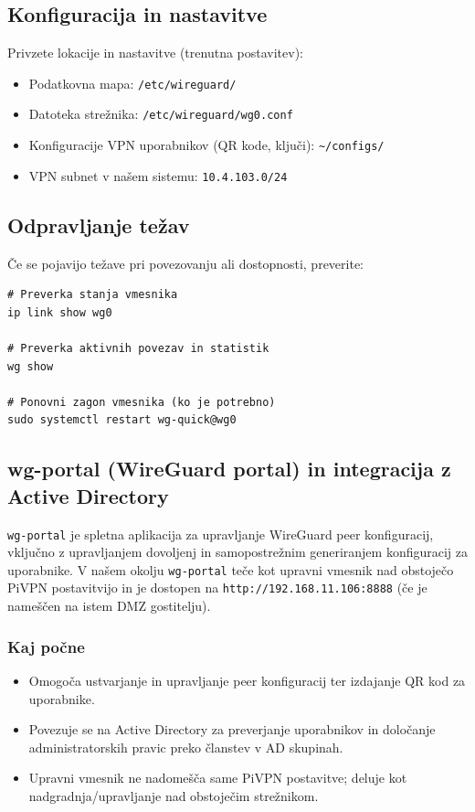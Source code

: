 \documentclass[a4paper,11pt]{article}
\begin{document}
\subsection{Konfiguracija in nastavitve}
Privzete lokacije in nastavitve (trenutna postavitev):
\begin{itemize}
  \item Podatkovna mapa: \verb|/etc/wireguard/|
  \item Datoteka strežnika: \verb|/etc/wireguard/wg0.conf|
  \item Konfiguracije VPN uporabnikov (QR kode, ključi): \verb|~/configs/|
  \item VPN subnet v našem sistemu: \texttt{10.4.103.0/24}
\end{itemize}

\subsection{Odpravljanje težav}
Če se pojavijo težave pri povezovanju ali dostopnosti, preverite:
\begin{lstlisting}
# Preverka stanja vmesnika
ip link show wg0

# Preverka aktivnih povezav in statistik
wg show

# Ponovni zagon vmesnika (ko je potrebno)
sudo systemctl restart wg-quick@wg0
\end{lstlisting}

\subsection{wg-portal (WireGuard portal) in integracija z Active Directory}
\texttt{wg-portal} je spletna aplikacija za upravljanje WireGuard peer konfiguracij, vključno z upravljanjem dovoljenj in samopostrežnim generiranjem konfiguracij za uporabnike. 
V našem okolju \texttt{wg-portal} teče kot upravni vmesnik nad obstoječo PiVPN postavitvijo in je dostopen na \texttt{http://192.168.11.106:8888} (če je nameščen na istem DMZ gostitelju).

\subsubsection{Kaj počne}
\begin{itemize}
  \item Omogoča ustvarjanje in upravljanje peer konfiguracij ter izdajanje QR kod za uporabnike.
  \item Povezuje se na Active Directory za preverjanje uporabnikov in določanje administratorskih pravic preko članstev v AD skupinah.
  \item Upravni vmesnik ne nadomešča same PiVPN postavitve; deluje kot nadgradnja/upravljanje nad obstoječim strežnikom.
\end{itemize}
\end{document}
